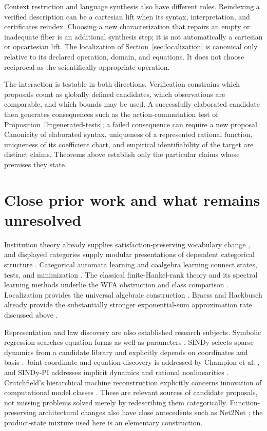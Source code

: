 \documentclass[11pt]{article}
\theoremstyle{definition}
\begin{document}
Context restriction and language synthesis also have different roles.
Reindexing a verified description can be a cartesian lift when its syntax,
interpretation, and certificates reindex. Choosing a new characterization
that repairs an empty or inadequate fiber is an additional synthesis step;
it is not automatically a cartesian or opcartesian lift. The localization
of Section~\ref{sec:localization} is canonical only relative to its declared
operation, domain, and equations. It does not choose reciprocal as the
scientifically appropriate operation.

The interaction is testable in both directions. Verification constrains
which proposals count as globally defined candidates, which observations
are comparable, and which bounds may be used. A successfully elaborated
candidate then generates consequences such as the action-commutation test
of Proposition~\ref{lr:generated-tests}; a failed consequence can require a
new proposal. Canonicity of elaborated syntax, uniqueness of a represented
rational function, uniqueness of its coefficient chart, and empirical
identifiability of the target are distinct claims. Theorems above establish
only the particular claims whose premises they state.

\section{Close prior work and what remains unresolved}
\label{sec:prior}

Institution theory already supplies satisfaction-preserving vocabulary
change \cite{cc-goguen-burstall,cc-goguen-rosu}, and displayed categories
supply modular presentations of dependent categorical structure
\cite{cc-displayed}. Categorical automata learning and coalgebra learning
connect states, tests, and minimization \cite{lr:calf,lr:coalgebra-duality}.
The classical finite-Hankel-rank theory and its spectral learning methods
underlie the WFA obstruction and class comparison
\cite{cc-balle-mohri,lr:denis2016}. Localization provides the universal
algebraic construction \cite{cc-stacks-localization}. Braess and Hackbusch
already provide the substantially stronger exponential-sum approximation
rate discussed above \cite{cc-braess-hackbusch}.

Representation and law discovery are also established research subjects.
Symbolic regression searches equation forms as well as parameters
\cite{lr:schmidt2009}. SINDy selects sparse dynamics from a candidate
library and explicitly depends on coordinates and basis \cite{cc-sindy}.
Joint coordinate and equation discovery is addressed by Champion et al.
\cite{cc-sindy-coordinates}, and SINDy-PI addresses implicit dynamics and
rational nonlinearities \cite{cc-sindy-pi}. Crutchfield's hierarchical
machine reconstruction explicitly concerns innovation of computational
model classes \cite{cc-emergence}. These are relevant sources of candidate
proposals, not missing problems solved merely by redescribing them
categorically. Function-preserving architectural changes also have close
antecedents such as Net2Net \cite{lr:net2net}; the product-state mixture
used here is an elementary construction.
\end{document}
